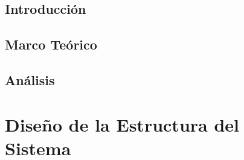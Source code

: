\documentclass[12pt]{book}
\begin{document}
\renewcommand{\listtablename}{Índice de tablas} 
\renewcommand{\tablename}{Tabla}


\thispagestyle{empty}

 

\frontmatter
\tableofcontents
\listoffigures
\listoftables
\mainmatter

\hideControlVersion

 
\chapter{Introducción}\label{chp:introduccion}
   
\chapter{Marco Teórico}\label{chp:marcoTeorico}
   
\chapter{Análisis}\label{chp:analisis}
    
\part{Diseño de la Estructura del Sistema}
\end{document}
